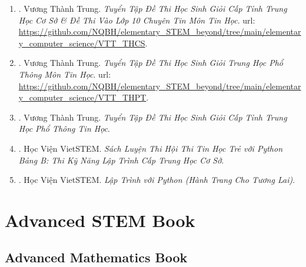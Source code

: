 \documentclass{article}
\begin{document}
\begin{enumerate}
	\item \cite{Trung_THCS_Tin}. Vương Thành Trung. \textit{Tuyển Tập Đề Thi Học Sinh Giỏi Cấp Tỉnh Trung Học Cơ Sở \& Đề Thi Vào Lớp 10 Chuyên Tin Môn Tin Học}. {\sc url}: \url{https://github.com/NQBH/elementary_STEM_beyond/tree/main/elementary_computer_science/VTT_THCS}.\hfill{\sf[reading]}
	\item \cite{Trung_THPT_Tin}. Vương Thành Trung. \textit{Tuyển Tập Đề Thi Học Sinh Giỏi Trung Học Phổ Thông Môn Tin Học}. {\sc url}: \url{https://github.com/NQBH/elementary_STEM_beyond/tree/main/elementary_computer_science/VTT_THPT}.\hfill{\sf[reading]}
	\item \cite{Trung_HSG_THPT_Tin}. Vương Thành Trung. \textit{Tuyển Tập Đề Thi Học Sinh Giỏi Cấp Tỉnh Trung Học Phổ Thông Tin Học}.\hfill{\sf[reading]}
	\item \cite{VietSTEM2021}. Học Viện VietSTEM. \textit{Sách Luyện Thi Hội Thi Tin Học Trẻ  với Python Bảng B: Thi Kỹ Năng Lập Trình Cấp Trung Học Cơ Sở}.\hfill{\sf[reading]}
	\item \cite{VietSTEM2022}. Học Viện VietSTEM. \textit{Lập Trình với Python (Hành Trang Cho Tương Lai)}.\hfill{\sf[done]}
\end{enumerate}


\section{Advanced STEM Book}

\subsection{Advanced Mathematics Book}
\end{document}
